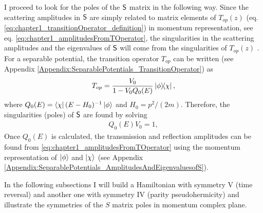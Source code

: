 I proceed to look for the poles of the ${\sf S}$ matrix in the following way. Since the scattering amplitudes in ${\sf S}$ are simply related to matrix elements of $T_{op}(z)$ (eq. \eqref{eq:chapter1_transitionOperator_definition}) in momentum representation, see eq. \eqref{eq:chapter1_amplitudesFromTOperator}, the singularities in the scattering amplitudes and the eigenvalues of ${\sf S}$ will come from the singularities of $T_{op}(z)$ \cite{Muga1996}. For a separable potential, the transition operator $T_{op}$ can be written (see Appendix \ref{Appendix:SeparablePotentials_TransitionOperator}) as
%
\begin{equation}
	T_{op}=\frac{V_{0}}{1-V_{0} Q_{0}(E)} \ketbra{\phi}{\chi},
  \label{eq:chapter2_TransitionOperatorSeparablePotential}
\end{equation}
%
where $Q_{0}(E)=\bra{\chi}(E-H_0)^{-1}\ket{\phi}$ and $H_{0}=p^{2}/(2m)$. Therefore, the singularities (poles) of ${\sf S}$ are found by solving
%
\begin{eqnarray}
	Q_{0}(E)V_{0} = 1,
	\label{eq:chapter2_roots}
\end{eqnarray}
%
Once $Q_{0}(E)$  is calculated, the transmission and reflection amplitudes can be found from \eqref{eq:chapter1_amplitudesFromTOperator} using the momentum representation of $\ket{\phi}$ and $\ket{\chi}$ (see Appendix \ref{Appendix:SeparablePotentials_AmplitudesAndEigenvaluesofS}).

In the following subsections I will build a Hamiltonian with symmetry V (time reversal) and another one with symmetry IV (parity pseudohermicity) and illustrate the symmetries of the $S$ matrix poles in momentum complex plane.
%
